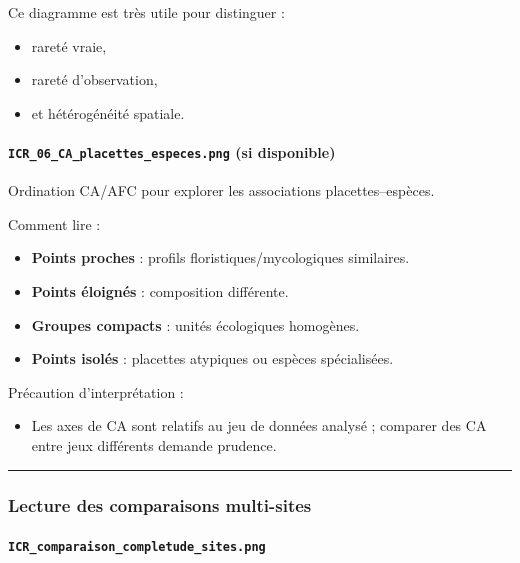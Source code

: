 Ce diagramme est très utile pour distinguer :

\begin{itemize}
\tightlist
\item
  rareté vraie,
\item
  rareté d'observation,
\item
  et hétérogénéité spatiale.
\end{itemize}

\paragraph{\texorpdfstring{\texttt{ICR\_06\_CA\_placettes\_especes.png}
(si
disponible)}{ICR\_06\_CA\_placettes\_especes.png (si disponible)}}\label{icr_06_ca_placettes_especes.png-si-disponible}

Ordination CA/AFC pour explorer les associations placettes--espèces.

Comment lire :

\begin{itemize}
\tightlist
\item
  \textbf{Points proches} : profils floristiques/mycologiques
  similaires.
\item
  \textbf{Points éloignés} : composition différente.
\item
  \textbf{Groupes compacts} : unités écologiques homogènes.
\item
  \textbf{Points isolés} : placettes atypiques ou espèces spécialisées.
\end{itemize}

Précaution d'interprétation :

\begin{itemize}
\tightlist
\item
  Les axes de CA sont relatifs au jeu de données analysé ; comparer des
  CA entre jeux différents demande prudence.
\end{itemize}

\begin{center}\rule{0.5\linewidth}{0.5pt}\end{center}

\subsubsection{Lecture des comparaisons
multi-sites}\label{lecture-des-comparaisons-multi-sites}

\paragraph{\texorpdfstring{\texttt{ICR\_comparaison\_completude\_sites.png}}{ICR\_comparaison\_completude\_sites.png}}\label{icr_comparaison_completude_sites.png}

